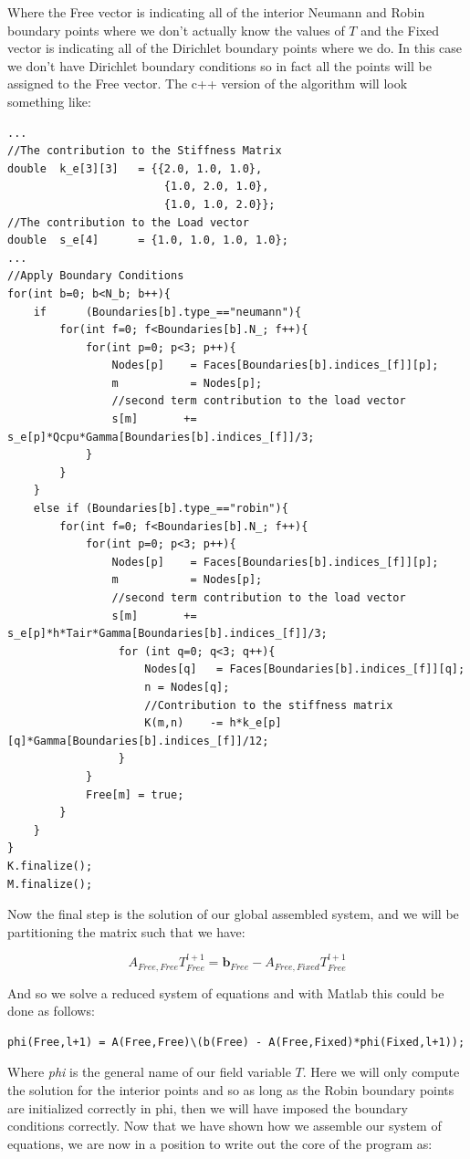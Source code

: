 \documentclass[12pt]{article}
\begin{document}
Where the Free vector is indicating all of the interior Neumann and Robin boundary points where we don't actually know the values of $T$ and the Fixed vector is indicating all of the Dirichlet boundary points where we do. In this case we don't have Dirichlet boundary conditions so in fact all the points will be assigned to the Free vector. The c++ version of the algorithm will look something like:

\begin{lstlisting}[style=MyC++Style]
...
//The contribution to the Stiffness Matrix
double	k_e[3][3]	= {{2.0, 1.0, 1.0}, 
						{1.0, 2.0, 1.0}, 
						{1.0, 1.0, 2.0}};
//The contribution to the Load vector
double	s_e[4]		= {1.0, 1.0, 1.0, 1.0};
...
//Apply Boundary Conditions
for(int b=0; b<N_b; b++){
	if		(Boundaries[b].type_=="neumann"){
		for(int f=0; f<Boundaries[b].N_; f++){
			for(int p=0; p<3; p++){
				Nodes[p]	= Faces[Boundaries[b].indices_[f]][p];
				m			= Nodes[p];
				//second term contribution to the load vector
				s[m]	   += s_e[p]*Qcpu*Gamma[Boundaries[b].indices_[f]]/3; 
			}
		}
	}
	else if	(Boundaries[b].type_=="robin"){
		for(int f=0; f<Boundaries[b].N_; f++){
			for(int p=0; p<3; p++){
				Nodes[p]	= Faces[Boundaries[b].indices_[f]][p];
				m			= Nodes[p];
				//second term contribution to the load vector
				s[m]	   += s_e[p]*h*Tair*Gamma[Boundaries[b].indices_[f]]/3; 
				 for (int q=0; q<3; q++){
					 Nodes[q]	= Faces[Boundaries[b].indices_[f]][q];
					 n = Nodes[q];
					 //Contribution to the stiffness matrix
					 K(m,n)    -= h*k_e[p][q]*Gamma[Boundaries[b].indices_[f]]/12; 
				 }
			}
			Free[m] = true;
		}
	}
}
K.finalize();
M.finalize();
\end{lstlisting}

Now the final step is the solution of our global assembled system, and we will be partitioning the matrix such that we have: 

$$
A_{Free,Free}T_{Free}^{l+1}=\textbf{b}_{Free}-A_{Free,Fixed}T_{Free}^{l+1}
$$

And so we solve a reduced system of equations and with Matlab this could be done as follows:

\begin{lstlisting}
phi(Free,l+1) = A(Free,Free)\(b(Free) - A(Free,Fixed)*phi(Fixed,l+1));
\end{lstlisting}

Where \textit{phi} is the general name of our field variable $T$. Here we will only compute the solution for the interior points and so as long as the Robin boundary points are initialized correctly in phi, then we will have imposed
the boundary conditions correctly. Now that we have shown how we assemble our system of equations, we are now in a position to write out the core of the program as:
\end{document}
